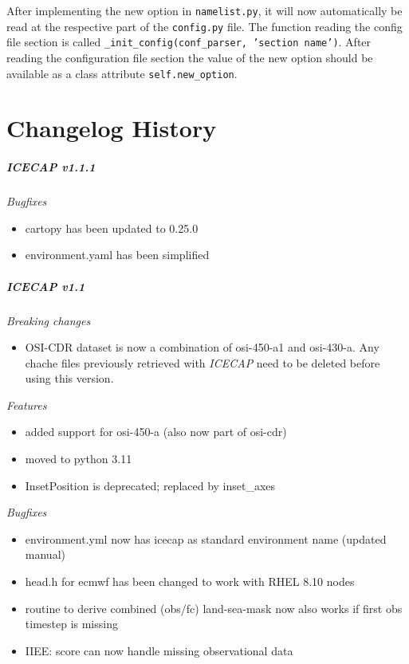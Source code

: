 \documentclass[DIV=10, parskip=full]{scrreprt}
\newcommand{\ice}{\textit{ICECAP}\xspace}
\begin{document}
After implementing the new option in \texttt{namelist.py}, it will now automatically be read at the respective part of the \texttt{config.py} file. The function reading the config file section is called \texttt{\_init\_config(conf\_parser, 'section name')}. After reading the configuration file section the value of the new option should be available as a class attribute \texttt{self.new\_option}.

\chapter{Changelog History}

\paragraph{\textbf{\ice v1.1.1\\[5pt]}}
\textit{Bugfixes}
\begin{itemize}
	\item cartopy has been updated to 0.25.0
	\item environment.yaml has been simplified 
\end{itemize}

\paragraph{\textbf{\ice v1.1\\[5pt]}}
\textit{Breaking changes}
\begin{itemize}
	\item  OSI-CDR dataset is now a combination of osi-450-a1 and osi-430-a. Any chache files previously retrieved with \ice need to be deleted before using this version.
\end{itemize}

\textit{Features}
\begin{itemize}
	\item added support for osi-450-a (also now part of osi-cdr)
	\item moved to python 3.11
	\item InsetPosition is deprecated; replaced by inset\_axes
\end{itemize}

\textit{Bugfixes}
\begin{itemize}
	\item environment.yml now has icecap as standard environment name (updated manual)
	\item head.h for ecmwf has been changed to work with RHEL 8.10 nodes
	\item routine to derive combined (obs/fc) land-sea-mask now also works if first obs timestep is missing
	\item IIEE: score can now handle missing observational data
\end{itemize}
\end{document}
